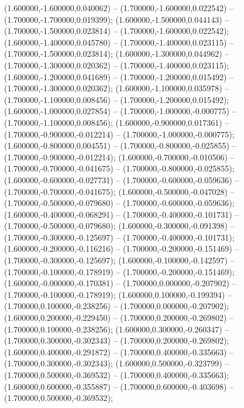  (1.600000,-1.600000,0.040062) -- (1.700000,-1.600000,0.022542) -- (1.700000,-1.700000,0.019399);
 (1.600000,-1.500000,0.044143) -- (1.700000,-1.500000,0.023814) -- (1.700000,-1.600000,0.022542);
 (1.600000,-1.400000,0.045780) -- (1.700000,-1.400000,0.023115) -- (1.700000,-1.500000,0.023814);
 (1.600000,-1.300000,0.044962) -- (1.700000,-1.300000,0.020362) -- (1.700000,-1.400000,0.023115);
 (1.600000,-1.200000,0.041689) -- (1.700000,-1.200000,0.015492) -- (1.700000,-1.300000,0.020362);
 (1.600000,-1.100000,0.035978) -- (1.700000,-1.100000,0.008456) -- (1.700000,-1.200000,0.015492);
 (1.600000,-1.000000,0.027854) -- (1.700000,-1.000000,-0.000775) -- (1.700000,-1.100000,0.008456);
 (1.600000,-0.900000,0.017361) -- (1.700000,-0.900000,-0.012214) -- (1.700000,-1.000000,-0.000775);
 (1.600000,-0.800000,0.004551) -- (1.700000,-0.800000,-0.025855) -- (1.700000,-0.900000,-0.012214);
 (1.600000,-0.700000,-0.010506) -- (1.700000,-0.700000,-0.041675) -- (1.700000,-0.800000,-0.025855);
 (1.600000,-0.600000,-0.027731) -- (1.700000,-0.600000,-0.059636) -- (1.700000,-0.700000,-0.041675);
 (1.600000,-0.500000,-0.047028) -- (1.700000,-0.500000,-0.079680) -- (1.700000,-0.600000,-0.059636);
 (1.600000,-0.400000,-0.068291) -- (1.700000,-0.400000,-0.101731) -- (1.700000,-0.500000,-0.079680);
 (1.600000,-0.300000,-0.091398) -- (1.700000,-0.300000,-0.125697) -- (1.700000,-0.400000,-0.101731);
 (1.600000,-0.200000,-0.116216) -- (1.700000,-0.200000,-0.151469) -- (1.700000,-0.300000,-0.125697);
 (1.600000,-0.100000,-0.142597) -- (1.700000,-0.100000,-0.178919) -- (1.700000,-0.200000,-0.151469);
 (1.600000,-0.000000,-0.170381) -- (1.700000,0.000000,-0.207902) -- (1.700000,-0.100000,-0.178919);
 (1.600000,0.100000,-0.199394) -- (1.700000,0.100000,-0.238256) -- (1.700000,0.000000,-0.207902);
 (1.600000,0.200000,-0.229450) -- (1.700000,0.200000,-0.269802) -- (1.700000,0.100000,-0.238256);
 (1.600000,0.300000,-0.260347) -- (1.700000,0.300000,-0.302343) -- (1.700000,0.200000,-0.269802);
 (1.600000,0.400000,-0.291872) -- (1.700000,0.400000,-0.335663) -- (1.700000,0.300000,-0.302343);
 (1.600000,0.500000,-0.323799) -- (1.700000,0.500000,-0.369532) -- (1.700000,0.400000,-0.335663);
 (1.600000,0.600000,-0.355887) -- (1.700000,0.600000,-0.403698) -- (1.700000,0.500000,-0.369532);
